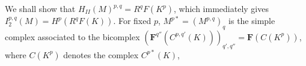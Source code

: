 We shall show that $H_{II}(M)^{p,q}=R^qF(K^p)$, which immediately
gives $ I_2^{p,q}(M)=H^p(R^qF(K))$. For fixed $p$,
$M^{p*}=(M^{p,q})_q$ is the simple complex associated to the bicomplex
$(\mathbf F^{q''}(C^{p,q'}(K)))_{q',q''}=\mathbf F(C(K^p))$,
where $C(K^p)$ denotes the complex $C^{p*}(K)$,


